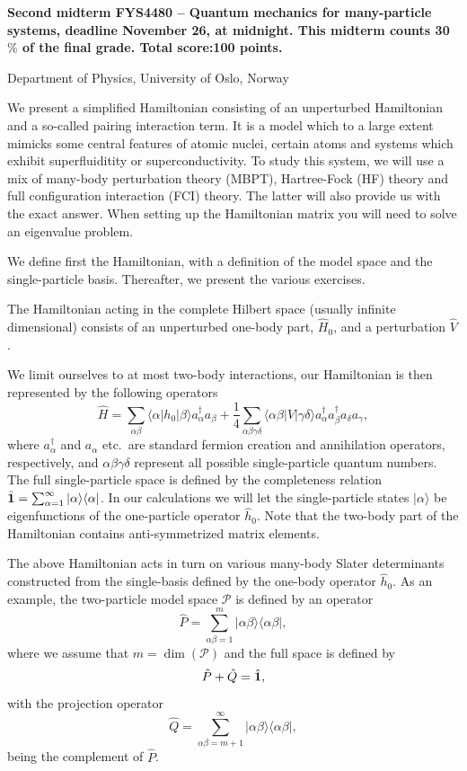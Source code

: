 \documentclass[prc]{revtex4} \usepackage[dvips]{graphicx}
\begin{document}
\begin{center}
{\LARGE\bf
Second midterm FYS4480 – Quantum mechanics for many-particle systems, deadline November 26, at midnight. This midterm counts 30$\%$ of the final grade. Total score:100 points.}
\end{center}
\begin{center}
\centerline{{\small Department of Physics, University of Oslo, Norway}}
\end{center}


We present a simplified Hamiltonian consisting of an unperturbed
Hamiltonian and a so-called pairing interaction term. It is a model
which to a large extent mimicks some central features of atomic
nuclei, certain atoms and systems which exhibit superfluiditity or
superconductivity.  To study this system, we will use a mix of
many-body perturbation theory (MBPT), Hartree-Fock (HF) theory and full
configuration interaction (FCI) theory. The latter will also provide us with
the exact answer.  When setting up the Hamiltonian matrix you will
need to solve an eigenvalue problem.

We define first the Hamiltonian, with a definition of the model space
and the single-particle basis. Thereafter, we present the various
exercises.


The Hamiltonian acting in the complete Hilbert space (usually infinite
dimensional) consists of an unperturbed one-body part, $\hat{H}_0$,
and a perturbation $\hat{V}$.

We limit ourselves to at most two-body interactions, our Hamiltonian
is then represented by the following operators
\[
\hat{H} = \sum_{\alpha\beta}\langle \alpha |h_0|\beta\rangle
a_{\alpha}^{\dagger}a_{\beta}
+\frac{1}{4}\sum_{\alpha\beta\gamma\delta}\langle \alpha\beta|
V|\gamma\delta\rangle
a_{\alpha}^{\dagger}a_{\beta}^{\dagger}a_{\delta}a_{\gamma},
\]
where $a_{\alpha}^{\dagger}$ and $a_{\alpha}$ etc.~are standard
fermion creation and annihilation operators, respectively, and
$\alpha\beta\gamma\delta$ represent all possible single-particle
quantum numbers.  The full single-particle space is defined by the
completeness relation $\hat{{\bf 1}} = \sum_{\alpha
  =1}^{\infty}|\alpha \rangle \langle \alpha|$.  In our calculations
we will let the single-particle states $|\alpha\rangle$ be
eigenfunctions of the one-particle operator $\hat{h}_0$. Note that the two-body part of the Hamiltonian 
contains anti-symmetrized matrix elements.


The above Hamiltonian acts in turn on various many-body Slater
determinants constructed from the single-basis defined by the one-body
operator $\hat{h}_0$.  As an example, the two-particle model space
$\mathcal{P}$ is defined by an operator
\[
\hat{P} = \sum_{\alpha\beta =1}^{m}|\alpha\beta \rangle \langle
\alpha\beta|,
\]
where we assume that $m=\dim(\mathcal{P})$ and the full space is
defined by
\[
\hat{P}+\hat{Q}=\hat{{\bf 1}},
\]
with the projection operator
\[
\hat{Q} = \sum_{\alpha\beta =m+1}^{\infty}|\alpha\beta \rangle \langle
\alpha\beta|,
\]
being the complement of $\hat{P}$.
\end{document}
